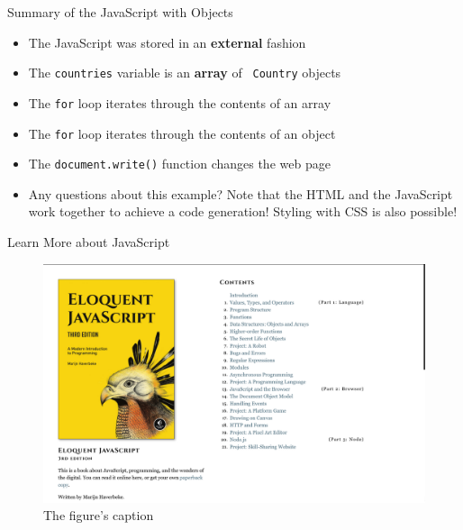 \documentclass[14pt,aspectratio=169]{beamer}
\begin{document}
%
\begin{frame}{Summary of the JavaScript with Objects}
  \begin{itemize}
    \item The JavaScript was stored in an {\bf external} fashion
      \vspace*{-.15in}
    \item The {\tt countries} variable is an {\bf array} of {\tt
      Country} objects
      \vspace*{-.15in}
    \item The {\tt for} loop iterates through the contents of an array
      \vspace*{-.15in}
    \item The {\tt for} loop iterates through the contents of an object
      \vspace*{-.15in}
    \item The {\tt document.write()} function changes the web page
      \vspace*{-.15in}
    \item Any questions about this example? Note that the HTML and the
      JavaScript work together to achieve a code generation! Styling with CSS is
      also possible!
      \vspace*{-.15in}
  \end{itemize}
\end{frame}

%
\begin{frame}{Learn More about JavaScript}
  \begin{figure}
    \centering
    \includegraphics[scale=.085]{images/eloquent-javascript.png}
    \caption{The figure's caption}
  \end{figure}
\end{frame}
\end{document}
